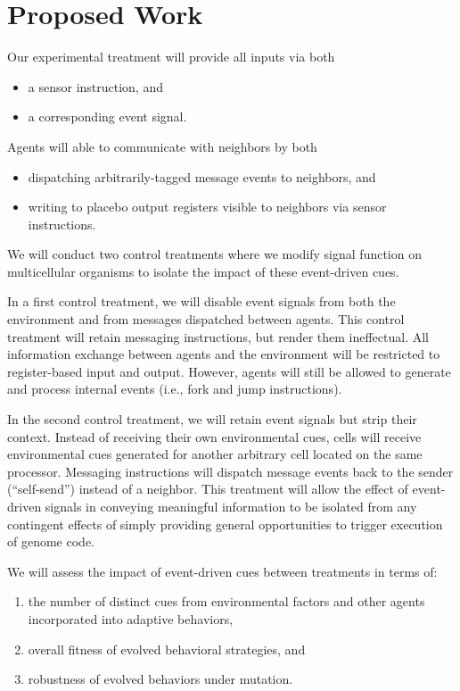 \section{Proposed Work}

Our experimental treatment will provide all inputs via both
\begin{itemize}
  \item a sensor instruction, and
  \item a corresponding event signal.
\end{itemize}
Agents will able to communicate with neighbors by both
\begin{itemize}
  \item dispatching arbitrarily-tagged message events to neighbors, and
  \item writing to placebo output registers visible to neighbors via sensor instructions.
\end{itemize}

We will conduct two control treatments where we modify signal function on multicellular organisms to isolate the impact of these event-driven cues.

In a first control treatment, we will disable event signals from both the environment and from messages dispatched between agents.
This control treatment will retain messaging instructions, but render them ineffectual.
All information exchange between agents and the environment will be restricted to register-based input and output.
However, agents will still be allowed to generate and process internal events (i.e., fork and jump instructions).

In the second control treatment, we will retain event signals but strip their context.
Instead of receiving their own environmental cues, cells will receive environmental cues generated for another arbitrary cell located on the same processor.
Messaging instructions will dispatch message events back to the sender (``self-send'') instead of a neighbor.
This treatment will allow the effect of event-driven signals in conveying meaningful information to be isolated from any contingent effects of simply providing general opportunities to trigger execution of genome code.

We will assess the impact of event-driven cues between treatments in terms of:
\begin{enumerate}
  \item the number of distinct cues from environmental factors and other agents incorporated into adaptive behaviors,
  \label{itm:interface-complexity;ch:influencing-cna}
  \item overall fitness of evolved behavioral strategies, and
  \label{itm:fitness;ch:influencing-cna}
  \item robustness of evolved behaviors under mutation.
  \label{itm:robustness;ch:influencing-cna}
\end{enumerate}

